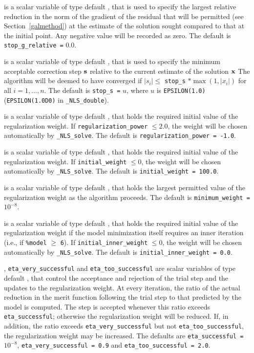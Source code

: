 \documentclass{galahad}
\newcommand{\packagename}{NLS}
\newcommand{\fullpackagename}{\libraryname\_\packagename}
\newcommand{\solver}{{\tt \fullpackagename\_solve}}
\begin{document}
\begin{description}
 is a scalar variable of type default \realdp,
that is used to specify the largest relative reduction in the norm of the
gradient of the residual that will be permitted
(see Section~\ref{galmethod}) at the estimate of the solution sought
compared to that at the initial point.
Any negative value will be recorded as zero.
The default is {\tt stop\_g\_relative =} $0.0$.

 is a scalar variable of type default \realdp,
that is used to specify the minimum acceptable correction step ${\mathbf{s}}$
relative to the current estimate of the solution ${\mathbf{x}}$
The algorithm will be deemed to have converged if $|s_i| \leq$
{\tt stop\_s} $\ast \max( 1, |x_i|)$ for all $i = 1, \ldots, n$.
The default is {\tt stop\_s =} $u$,
where $u$ is {\tt EPSILON(1.0)} ({\tt EPSILON(1.0D0)} in
{\tt \fullpackagename\_double}).

 is a scalar variable of type default \realdp,
that holds the required initial value of the regularization weight. If
{\tt regularization\_power} $\leq 2.0$, the weight will be chosen automatically
by \solver.
The default is {\tt regularization\_power = -1.0}.

 is a scalar variable of type default \realdp, that holds
the required initial value of the regularization weight. If
{\tt initial\_weight} $\leq 0$, the weight will be chosen automatically
by \solver.
The default is {\tt initial\_weight = 100.0}.

 is a scalar variable of type default \realdp, that holds
the largest permitted value of the regularization weight as the algorithm
proceeds.
The default is {\tt minimum\_weight =} $10^{-8}$.

 is a scalar variable of type default \realdp,
that holds the required initial value of the regularization weight if
the model minimization itself requires an inner iteration
(i.e., if {\tt \%model} $\geq$ {\tt 6}).
If {\tt initial\_inner\_weight} $\leq 0$, the weight will be chosen
automatically by \solver.
The default is {\tt initial\_inner\_weight = 0.0}.

, {\tt eta\_very\_successful}
and {\tt eta\_too\_successful}
are scalar variables of type default
\realdp, that control the acceptance and rejection of the trial step
and the updates to the regularization weight.
At every iteration, the ratio of the actual reduction in the merit function
following the trial step to that predicted by the model is computed.
The step is accepted whenever this ratio exceeds {\tt eta\_successful};
otherwise the regularization weight will be reduced.
If, in addition, the ratio exceeds {\tt eta\_very\_successful} but not
{\tt eta\_too\_successful}, the regularization weight may be increased.
The defaults are
{\tt eta\_successful =} $10^{-8}$,
{\tt eta\_very\_successful = 0.9} and
{\tt eta\_too\_successful = 2.0}.


\end{description}
\end{document}
